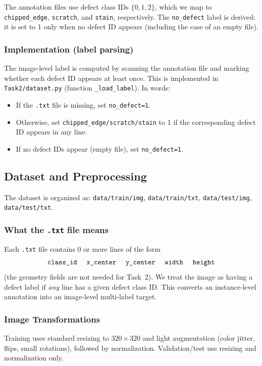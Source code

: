 The annotation files use defect class IDs $\{0,1,2\}$, which we map to \texttt{chipped\_edge}, \texttt{scratch}, and \texttt{stain}, respectively. The \texttt{no\_defect} label is derived: it is set to 1 only when no defect ID appears (including the case of an empty file).

\subsubsection{Implementation (label parsing)}
The image-level label is computed by scanning the annotation file and marking whether each defect ID appears at least once. This is implemented in \texttt{Task2/dataset.py} (function \texttt{\_load\_label}). In words:
\begin{itemize}
  \item If the \texttt{.txt} file is missing, set \texttt{no\_defect=1}.
  \item Otherwise, set \texttt{chipped\_edge/scratch/stain} to 1 if the corresponding defect ID appears in any line.
  \item If no defect IDs appear (empty file), set \texttt{no\_defect=1}.
\end{itemize}

\subsection{Dataset and Preprocessing}
The dataset is organized as:\; \texttt{data/train/img}, \texttt{data/train/txt}, \texttt{data/test/img}, \texttt{data/test/txt}.

\subsubsection{What the \texttt{.txt} file means}
Each \texttt{.txt} file contains 0 or more lines of the form
\[\texttt{class\_id \; x\_center \; y\_center \; width \; height}\]
(the geometry fields are not needed for Task~2). We treat the image as having a defect label if \emph{any} line has a given defect class ID. This converts an instance-level annotation into an image-level multi-label target.

\subsubsection{Image Transformations}
Training uses standard resizing to $320\times 320$ and light augmentation (color jitter, flips, small rotations), followed by normalization. Validation/test use resizing and normalization only.

